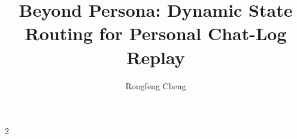 \documentclass[10pt]{article}
\title{Beyond Persona: Dynamic State Routing for Personal Chat-Log Replay}
\author{Rongfeng Cheng}
\date{}
\begin{document}
\maketitle










{\scriptsize
\begin{multicols}{2}


\end{multicols}
}
\end{document}

